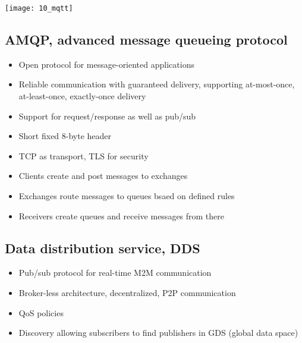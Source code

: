 \texttt{[image: 10\_mqtt]}

\subsection{AMQP, advanced message queueing protocol}

\begin{itemize}
		\item Open protocol for message-oriented applications
		\item Reliable communication with guaranteed delivery, supporting
				at-most-once, at-least-once, exactly-once delivery
		\item Support for request/response as well as pub/sub
		\item Short fixed 8-byte header
		\item TCP as transport, TLS for security
		\item Clients create and post messages to exchanges
		\item Exchanges route messages to queues bsaed on defined rules
		\item Receivers create queues and receive messages from there
\end{itemize}

\subsection{Data distribution service, DDS}

\begin{itemize}
		\item Pub/sub protocol for real-time M2M communication
		\item Broker-less architecture, decentralized, P2P communication
		\item QoS policies
		\item Discovery allowing subscribers to find publishers in GDS (global data space)
\end{itemize}

